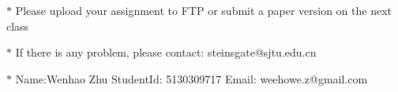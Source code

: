 \documentclass[12pt,a4paper]{article}
\theoremstyle{definition}
\numberwithin{equation}{section}
\numberwithin{figure}{section}
\begin{document}
\noindent

\noindent{}
\begin{center}
\footnotesize{\color{red}$*$ Please upload your assignment to FTP or submit a paper version on the next class}

\footnotesize{\color{red}$*$ If there is any problem, please contact: steinsgate@sjtu.edu.cn}

\footnotesize{\color{blue}$*$ Name:Wenhao Zhu    \quad StudentId: 5130309717 \quad Email: weehowe.z@gmail.com}
\end{center}
\end{document}
